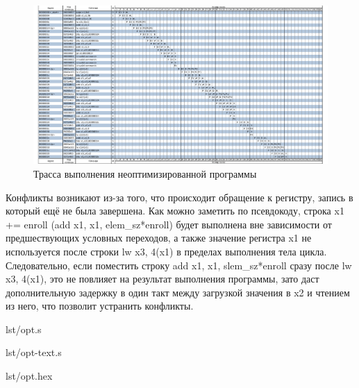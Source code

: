 \documentclass[a4paper,oneside,14pt]{extarticle}
\begin{document}
\begin{figure}[H]
	\centering
	\includegraphics[width=1\textwidth]{img/pipeline-unoptimized.pdf}
    \caption{Трасса выполнения неоптимизированной программы}
	\label{fig:pu}
\end{figure}

Конфликты возникают из-за того, что происходит обращение к регистру, запись в который ещё не была завершена.
Как можно заметить по псевдокоду, строка x1 += enroll (add x1, x1, elem\_sz*enroll) будет выполнена вне зависимости от предшествующих условных переходов, а также значение регистра x1 не используется после строки lw x3, 4(x1) в пределах выполнения тела цикла.
Следовательно, если поместить строку add x1, x1, slem\_sz*enroll сразу после lw x3, 4(x1), это не повлияет на результат выполнения программы, зато даст дополнительную задержку в один такт между загрузкой значения в x2 и чтением из него, что позволит устранить конфликты.

\begin{code}
\begin{lstinputlisting}[
        label={lst:1},
        caption={Оптимизированный код программы по варианту на языке ассемблера}
    ]{lst/opt.s}
\end{lstinputlisting}
\end{code}

\begin{code}
\begin{lstinputlisting}[
        label={lst:1},
        caption={Дизассемблированный листинг оптимизированного кода программы по варианту}
    ]{lst/opt-text.s}
\end{lstinputlisting}
\end{code}

\begin{code}
\begin{lstinputlisting}[
        label={lst:1},
        caption={Оптимизированный код программы по варианту в шестнадцатеричном представлении}
    ]{lst/opt.hex}
\end{lstinputlisting}
\end{code}
\end{document}
